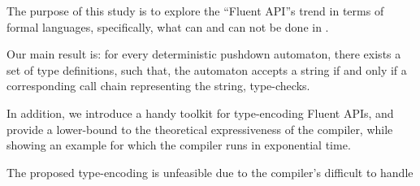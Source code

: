 The purpose of this study is to explore the ``Fluent API''s trend in
  terms of formal languages, specifically, what can and can not be done 
  in \Java.

Our main result is: for every deterministic pushdown automaton,
  there exists a set of \Java type definitions, such that,
  the automaton accepts a string if and only if a corresponding 
  call chain representing the string, type-checks.

In addition, we introduce a handy toolkit for type-encoding Fluent APIs,
and provide a lower-bound to the theoretical expressiveness of the \Java compiler,
  while showing an example for which the compiler runs in exponential time.
  
The proposed type-encoding is unfeasible due to the compiler's difficult to 
  handle 
